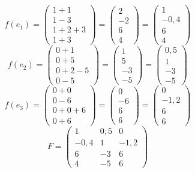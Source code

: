 $$ f(e_1) =
\begin{pmatrix}
	1 + 1 \\
    1 - 3 \\
    1 + 2 + 3 \\
    1 + 3
\end{pmatrix} =
\begin{pmatrix}
	2 \\
    -2 \\
    6 \\
    4
\end{pmatrix} =
\begin{pmatrix}
	1 \\
    -0,4 \\
    6 \\
    4
\end{pmatrix} $$
$$ f(e_2) =
\begin{pmatrix}
	0 + 1 \\
    0 + 5 \\
    0 + 2 - 5 \\
    0 - 5
\end{pmatrix} =
\begin{pmatrix}
	1 \\
    5 \\
    -3 \\
    -5
\end{pmatrix} =
\begin{pmatrix}
	0,5 \\
    1 \\
    -3 \\
    -5
\end{pmatrix} $$
$$ f(e_3) =
\begin{pmatrix}
	0 + 0 \\
    0 - 6 \\
    0 + 0 + 6 \\
    0 + 6
\end{pmatrix} =
\begin{pmatrix}
	0 \\
    -6 \\
    6 \\
    6
\end{pmatrix} =
\begin{pmatrix}
	0 \\
    -1,2 \\
    6 \\
    6
\end{pmatrix} $$
$$ F =
\begin{pmatrix}
	1 & 0,5 & 0 \\
    -0,4 & 1 & -1,2 \\
    6 & -3 & 6 \\
    4 & -5 & 6
\end{pmatrix} $$

